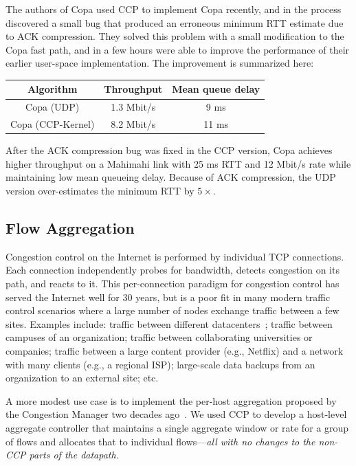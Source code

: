 The authors of Copa used CCP to implement Copa recently, and in the process discovered a small bug that produced an erroneous minimum RTT estimate due to ACK compression. They solved this problem with a small modification to the Copa fast path,
and in a few hours were able to improve the performance of their earlier user-space implementation. The improvement is summarized here:\\

    \begin{tabular}{c|c|c}
        Algorithm & Throughput & Mean queue delay \\
        \hline
        Copa (UDP) & 1.3 Mbit/s & 9 ms\\
        Copa (CCP-Kernel) & 8.2 Mbit/s  & 11 ms\\
    \end{tabular}

\smallskip
After the ACK compression bug was fixed in the CCP version, Copa achieves higher throughput on a Mahimahi link with 25 ms RTT and 12 Mbit/s rate while maintaining low mean queueing delay. Because of ACK compression, the UDP version over-estimates the minimum RTT by $5\times$.

\subsection{Flow Aggregation}
\label{s:capabilities:agg}

Congestion control on the Internet is performed by individual TCP connections. Each connection independently probes for bandwidth, detects congestion on its path, and reacts to it.
This per-connection paradigm for congestion control has served the Internet well for 30 years, but is a poor fit in many modern traffic control scenarios where a large number of nodes exchange traffic between a few sites.
Examples include: traffic between different datacenters~\cite{b4, swan}; traffic between campuses of an organization; traffic between collaborating universities or companies; traffic between a large content provider (e.g., Netflix) and a network with many clients (e.g., a regional ISP); large-scale data backups from an organization to an external site; etc.

A more modest use case is to implement the per-host aggregation proposed by the
Congestion Manager two decades ago~\cite{cm}. We used CCP to develop a
host-level aggregate controller that maintains a single aggregate window or rate
for a group of flows and allocates that to individual flows---{\em all with no
  changes to the non-CCP parts of the datapath.}

